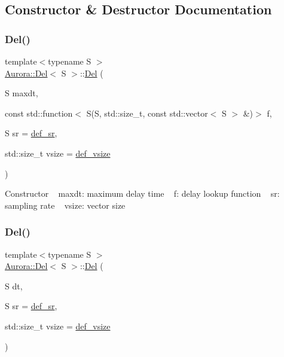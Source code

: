 \subsection{Constructor \& Destructor Documentation}
\mbox{\label{class_aurora_1_1_del_ad2236892c8f3459010f7570bee8275a1}} 
\subsubsection{\texorpdfstring{Del()}{Del()}\hspace{0.1cm}{\footnotesize\ttfamily [1/2]}}
{\footnotesize\ttfamily template$<$typename S $>$ \\
\hyperlink{class_aurora_1_1_del}{Aurora\+::\+Del}$<$ S $>$\+::\hyperlink{class_aurora_1_1_del}{Del} (\begin{DoxyParamCaption}\item[{S}]{maxdt,  }\item[{const std\+::function$<$ S(S, std\+::size\+\_\+t, const std\+::vector$<$ S $>$ \&)$>$}]{f,  }\item[{S}]{sr = {\ttfamily \hyperlink{namespace_aurora_ad49263d809bea98dd422e95bc91bc03e}{def\+\_\+sr}},  }\item[{std\+::size\+\_\+t}]{vsize = {\ttfamily \hyperlink{namespace_aurora_afaaddf667a06e7ce23c667a8b7295263}{def\+\_\+vsize}} }\end{DoxyParamCaption})\hspace{0.3cm}{\ttfamily [inline]}}

Constructor ~\newline
maxdt\+: maximum delay time ~\newline
f\+: delay lookup function ~\newline
sr\+: sampling rate ~\newline
vsize\+: vector size \mbox{\label{class_aurora_1_1_del_ae7ee559e909a215a6d8248d9c9a0ced8}} 
\subsubsection{\texorpdfstring{Del()}{Del()}\hspace{0.1cm}{\footnotesize\ttfamily [2/2]}}
{\footnotesize\ttfamily template$<$typename S $>$ \\
\hyperlink{class_aurora_1_1_del}{Aurora\+::\+Del}$<$ S $>$\+::\hyperlink{class_aurora_1_1_del}{Del} (\begin{DoxyParamCaption}\item[{S}]{dt,  }\item[{S}]{sr = {\ttfamily \hyperlink{namespace_aurora_ad49263d809bea98dd422e95bc91bc03e}{def\+\_\+sr}},  }\item[{std\+::size\+\_\+t}]{vsize = {\ttfamily \hyperlink{namespace_aurora_afaaddf667a06e7ce23c667a8b7295263}{def\+\_\+vsize}} }\end{DoxyParamCaption})\hspace{0.3cm}{\ttfamily [inline]}}

